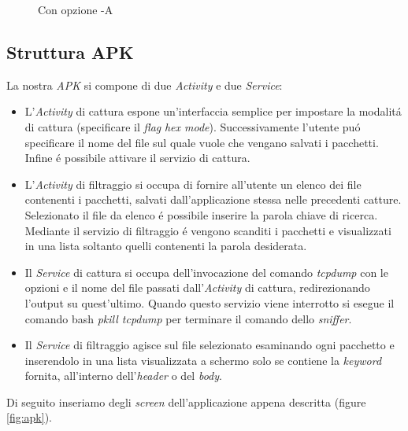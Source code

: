 \documentclass[12pt]{article} %
\begin{document}
\begin{figure}[H] %
\caption{Con opzione -A}\label{fig:A}
\end{figure}

\newpage
\subsection{Struttura APK}
La nostra \textit{APK} si compone di due \textit{Activity} e due \textit{Service}:

\begin{itemize}
\item L'\textit{Activity} di cattura espone un'interfaccia semplice per impostare la modalit\'a di cattura (specificare il \textit{flag} \textit{hex mode}). Successivamente l'utente pu\'o specificare il nome del file sul quale vuole che vengano salvati i pacchetti. Infine \'e possibile attivare il servizio di cattura.
\item L'\textit{Activity} di filtraggio si occupa di fornire all'utente un elenco dei file contenenti i pacchetti, salvati dall'applicazione stessa nelle precedenti catture. Selezionato il file da elenco \'e possibile inserire la parola chiave di ricerca. Mediante il servizio di filtraggio \'e vengono scanditi i pacchetti e visualizzati in una lista soltanto quelli contenenti la parola desiderata.
\item Il \textit{Service} di cattura si occupa dell'invocazione del comando \textit{tcpdump} con le opzioni e il nome del file passati dall'\textit{Activity} di cattura, redirezionando l'output su quest'ultimo. Quando questo servizio viene interrotto si esegue il comando bash \textit{pkill tcpdump} per terminare il comando dello \textit{sniffer}. 
\item Il \textit{Service} di filtraggio agisce sul file selezionato esaminando ogni pacchetto e inserendolo in una lista visualizzata a schermo solo se contiene la \textit{keyword} fornita, all'interno dell'\textit{header} o del \textit{body}.
\end{itemize}
 
Di seguito inseriamo degli \textit{screen} dell'applicazione appena descritta (figure \ref{fig:apk}).
 
\end{document}
